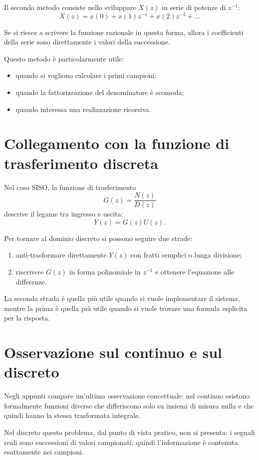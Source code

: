 Il secondo metodo consiste nello sviluppare \(X(z)\) in serie di potenze di \(z^{-1}\):
\[
X(z)=x(0)+x(1)z^{-1}+x(2)z^{-2}+\dots
\]

Se si riesce a scrivere la funzione razionale in questa forma,
allora i coefficienti della serie sono direttamente i valori della successione.

Questo metodo \`e particolarmente utile:
\begin{itemize}
    \item quando si vogliono calcolare i primi campioni;
    \item quando la fattorizzazione del denominatore \`e scomoda;
    \item quando interessa una realizzazione ricorsiva.
\end{itemize}

\section{Collegamento con la funzione di trasferimento discreta}

Nel caso SISO, la funzione di trasferimento
\[
G(z)=\frac{N(z)}{D(z)}
\]
descrive il legame tra ingresso e uscita:
\[
Y(z)=G(z)U(z).
\]

Per tornare al dominio discreto si possono seguire due strade:
\begin{enumerate}
    \item anti-trasformare direttamente \(Y(z)\) con fratti semplici o lunga divisione;
    \item riscrivere \(G(z)\) in forma polinomiale in \(z^{-1}\) e ottenere
    l'equazione alle differenze.
\end{enumerate}

La seconda strada \`e quella pi\`u utile quando si vuole implementare il sistema,
mentre la prima \`e quella pi\`u utile quando si vuole trovare una formula esplicita
per la risposta.

\section{Osservazione sul continuo e sul discreto}

Negli appunti compare un'ultima osservazione concettuale:
nel continuo esistono formalmente funzioni diverse che differiscono solo su insiemi
di misura nulla e che quindi hanno la stessa trasformata integrale.

Nel discreto questo problema, dal punto di vista pratico, non si presenta:
i segnali reali sono successioni di valori campionati, quindi l'informazione
\`e contenuta esattamente nei campioni.

